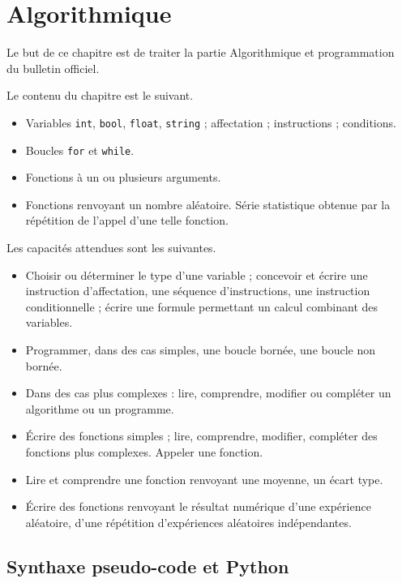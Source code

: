 
\chapter{Algorithmique}

Le but de ce chapitre est de traiter la partie \og Algorithmique et programmation \fg~ du bulletin officiel.

Le contenu du chapitre est le suivant.
	\begin{itemize}
		\item Variables \texttt{int}, \texttt{bool}, \texttt{float}, \texttt{string} ; affectation ; instructions ; conditions.
		\item Boucles \texttt{for} et \texttt{while}.
		\item Fonctions à un ou plusieurs arguments.
		\item Fonctions renvoyant un nombre aléatoire. Série statistique obtenue par la répétition de l'appel d'une telle fonction.
	\end{itemize}

Les capacités attendues sont les suivantes.
	\begin{itemize}
		\item Choisir ou déterminer le type d'une variable ; concevoir et écrire une instruction d'affectation, une séquence d'instructions, une instruction conditionnelle ; écrire une formule permettant un calcul combinant des variables.
		\item Programmer, dans des cas simples, une boucle bornée, une boucle non bornée.
		\item Dans des cas plus complexes : lire, comprendre, modifier ou compléter un algorithme ou un programme.
		\item Écrire des fonctions simples ; lire, comprendre, modifier, compléter des fonctions plus complexes. Appeler une fonction.
		\item Lire et comprendre une fonction renvoyant une moyenne, un écart type.
		\item Écrire des fonctions renvoyant le résultat numérique d'une expérience aléatoire, d'une répétition d'expériences aléatoires indépendantes.
	\end{itemize}

\section{Synthaxe pseudo-code et Python}



